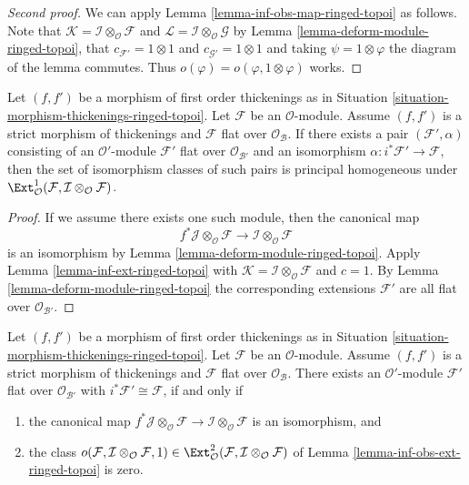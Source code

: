 \begin{proof}[Second proof]
We can apply Lemma \ref{lemma-inf-obs-map-ringed-topoi} as follows. Note that
$\mathcal{K} = \mathcal{I} \otimes_\mathcal{O} \mathcal{F}$ and
$\mathcal{L} = \mathcal{I} \otimes_\mathcal{O} \mathcal{G}$
by Lemma \ref{lemma-deform-module-ringed-topoi}, that
$c_{\mathcal{F}'} = 1 \otimes 1$ and $c_{\mathcal{G}'} = 1 \otimes 1$
and taking $\psi = 1 \otimes \varphi$ the diagram of the lemma
commutes. Thus $o(\varphi) = o(\varphi, 1 \otimes \varphi)$
works.
\end{proof}

\begin{lemma}
\label{lemma-inf-ext-rel-ringed-topoi}
Let $(f, f')$ be a morphism of first order thickenings as in
Situation \ref{situation-morphism-thickenings-ringed-topoi}.
Let $\mathcal{F}$ be an $\mathcal{O}$-module.
Assume $(f, f')$ is a strict morphism of thickenings and
$\mathcal{F}$ flat over $\mathcal{O}_\mathcal{B}$. If there exists a pair
$(\mathcal{F}', \alpha)$ consisting of an
$\mathcal{O}'$-module $\mathcal{F}'$ flat over $\mathcal{O}_{\mathcal{B}'}$
and an isomorphism
$\alpha : i^*\mathcal{F}' \to \mathcal{F}$, then the set of
isomorphism classes of such pairs is principal homogeneous
under
$\Ext^1_\mathcal{O}(
\mathcal{F}, \mathcal{I} \otimes_\mathcal{O} \mathcal{F})$.
\end{lemma}

\begin{proof}
If we assume there exists one such module, then the canonical map
$$
f^*\mathcal{J} \otimes_\mathcal{O} \mathcal{F} \to
\mathcal{I} \otimes_\mathcal{O} \mathcal{F}
$$
is an isomorphism by Lemma \ref{lemma-deform-module-ringed-topoi}. Apply
Lemma \ref{lemma-inf-ext-ringed-topoi} with $\mathcal{K} = 
\mathcal{I} \otimes_\mathcal{O} \mathcal{F}$
and $c = 1$. By Lemma \ref{lemma-deform-module-ringed-topoi}
the corresponding extensions
$\mathcal{F}'$ are all flat over $\mathcal{O}_{\mathcal{B}'}$.
\end{proof}

\begin{lemma}
\label{lemma-inf-obs-ext-rel-ringed-topoi}
Let $(f, f')$ be a morphism of first order thickenings as in
Situation \ref{situation-morphism-thickenings-ringed-topoi}.
Let $\mathcal{F}$ be an $\mathcal{O}$-module. Assume
$(f, f')$ is a strict morphism of thickenings
and $\mathcal{F}$ flat over $\mathcal{O}_\mathcal{B}$. There exists an
$\mathcal{O}'$-module $\mathcal{F}'$ flat over $\mathcal{O}_{\mathcal{B}'}$
with $i^*\mathcal{F}' \cong \mathcal{F}$, if and only if
\begin{enumerate}
\item the canonical map
$f^*\mathcal{J} \otimes_\mathcal{O} \mathcal{F} \to
\mathcal{I} \otimes_\mathcal{O} \mathcal{F}$
is an isomorphism, and
\item the class
$o(\mathcal{F}, \mathcal{I} \otimes_\mathcal{O} \mathcal{F}, 1)
\in \Ext^2_\mathcal{O}(
\mathcal{F}, \mathcal{I} \otimes_\mathcal{O} \mathcal{F})$
of Lemma \ref{lemma-inf-obs-ext-ringed-topoi} is zero.
\end{enumerate}
\end{lemma}

